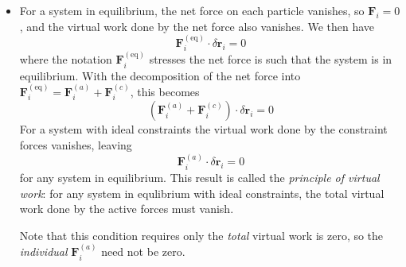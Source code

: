 \documentclass[11pt, a4paper]{article}
\begin{document}
\begin{itemize}
	
	\item For a system in equilibrium, the net force on each particle vanishes, so $ \bm{F}_{i} = 0 $, and the virtual work done by the net force also vanishes. We then have
	\begin{equation*}
		\bm{F}_{i}^{(\text{eq})} \cdot \delta \bm{r}_{i} = 0
	\end{equation*}
	where the notation $ \bm{F}_{i}^{(\text{eq})} $ stresses the net force is such that the system is in equilibrium. With the decomposition of the net force into $ \bm{F}_{i}^{(\text{eq})} = \bm{F}_{i}^{(a)} + \bm{F}_{i}^{(c)} $, this becomes
	\begin{equation*}
		 \left (\bm{F}_{i}^{(a)} + \bm{F}_{i}^{(c)}\right ) \cdot \delta \bm{r}_{i} = 0
	\end{equation*}
	For a system with ideal constraints the virtual work done by the constraint forces vanishes, leaving
	\begin{equation*}
		\bm{F}_{i}^{(a)} \cdot \delta \bm{r}_{i} = 0
	\end{equation*}
	for any system in equilibrium. This result is called the \textit{principle of virtual work}: for any system in equlibrium with ideal constraints, the total virtual work done by the active forces must vanish. 
	
	Note that this condition requires only the \textit{total} virtual work is zero, so the \textit{individual} $ \bm{F}_{i}^{(a)} $ need not be zero.
	

\end{itemize}
\end{document}
